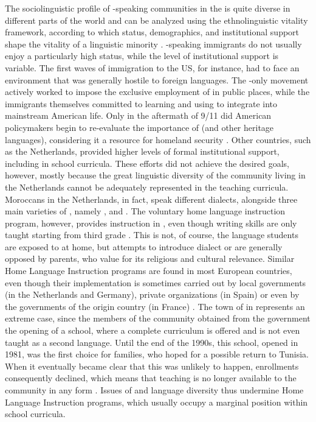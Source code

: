 \documentclass[output=paper]{langsci/langscibook}
\begin{document}
The sociolinguistic profile of -speaking communities in the  is quite diverse in different parts of the world and can be analyzed using the ethnolinguistic vitality framework, according to which status, demographics, and institutional support shape the vitality of a linguistic minority \citep{GilesTaylor1977,Ehala2015}. -speaking immigrants do not usually enjoy a particularly high status, while the level of institutional support is variable. The first waves of immigration to the US, for instance, had to face an environment that was generally hostile to foreign languages. The -only movement actively worked to impose the exclusive employment of  in public places, while the immigrants themselves committed to learning and using  to integrate into mainstream American life. Only in the aftermath of 9/11 did American policymakers begin to re-evaluate the importance of  (and other heritage languages), considering it a resource for homeland security \citep[319--320]{Albirini2016}. Other countries, such as the Netherlands, provided higher levels of formal institutional support, including  in school curricula. These efforts did not achieve the desired goals, however, mostly because the great linguistic diversity of the  community living in the Netherlands cannot be adequately represented in the teaching curricula. Moroccans in the Netherlands, in fact, speak different  dialects, alongside three main varieties of , namely ,  and  \citep[160--161]{ExtraDeRuiter1994}. The voluntary home language instruction program, however, provides instruction in  , even though writing skills are only taught starting from third grade \citep[163--165]{ExtraDeRuiter1994}. This is not, of course, the language students are exposed to at home, but attempts to introduce  dialect or  are generally opposed by parents, who value   for its religious and cultural relevance. Similar Home Language Instruction programs are found in most European countries, even though their implementation is sometimes carried out by local governments (in the Netherlands and Germany), private organizations (in Spain) or even by the governments of the origin country (in France) \citep[264--265]{BoumansdeRuiter2002}. The  town of  in  represents an extreme case, since the members of the  community obtained from the  government the opening of a  school, where a complete  curriculum is offered and  is not even taught as a second language. Until the end of the 1990s, this school, opened in 1981, was the first choice for  families, who hoped for a possible return to Tunisia. When it eventually became clear that this was unlikely to happen, enrollments consequently declined, which means that  teaching is no longer available to the community in any form \citep[73--77]{Danna2017book}. Issues of  and language diversity thus undermine Home Language Instruction programs, which usually occupy a marginal position within school curricula.
\end{document}
